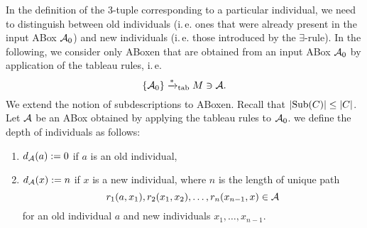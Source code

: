 \documentclass[openany]{scrbook}
\theoremstyle{break}
\theoremstyle{nonumberbreak}
\theoremstyle{nonumberplain}
\theoremstyle{nonumberbreak}
\newcommand{\then}{\Longrightarrow}
\newcommand{\abs}[2][]{\left|{#2}\right|\ifx#1\then\else_{#1}\fi}
\newcommand{\set}[1]{\left\{#1\right\}}
\newcommand{\ie}{i{.}\,e{.}\xspace}
\newcommand{\Sub}{\operatorname{Sub}}
\begin{document}
In the definition of the 3-tuple corresponding to a particular
individual, we need to distinguish between old individuals (\ie ones
that were already present in the input ABox ${\cal A}_0$) and new
individuals (\ie those introduced by the $\exists$-rule). In the
following, we consider only ABoxen that are obtained from an input
ABox ${\cal A}_0$ by application of the tableau rules, \ie
\begin{equation*}
  \set{{\cal A}_0} \xrightarrow{*}_{\operatorname{tab}} M \ni
  {\cal A}.
\end{equation*}
We extend the notion of subdescriptions to ABoxen. Recall that
$\abs{\Sub(C)} \leq \abs{C}$. Let ${\cal A}$ be an ABox obtained by
applying the tableau rules to ${\cal A}_0$. we define the depth of
individuals as follows:
\begin{enumerate}
\item $d_{\cal A}(a) := 0$ if $a$ is an old individual,
\item $d_{\cal A}(x) := n$ if $x$ is a new individual, where $n$
  is the length of unique path
  \begin{equation*}
    r_1(a, x_1), r_2(x_1, x_2), \dotsc, r_n(x_{n - 1}, x) \in {\cal A}
  \end{equation*}
  for an old individual $a$ and new individuals $x_1, \dotsc, x_{n
    - 1}$.
\end{enumerate}
\end{document}
